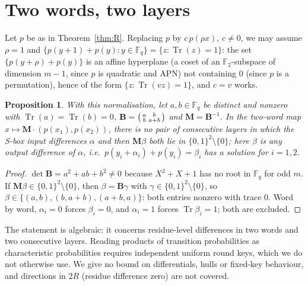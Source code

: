 \documentclass[preprint,12pt]{elsarticle}
\newtheorem{proposition}[theorem]{Proposition}
\theoremstyle{definition}
\newcommand{\F}{\mathbb{F}}
\newcommand{\Tr}{\operatorname{Tr}}
\begin{document}
\section{Two words, two layers}\label{sec:W}
Let $p$ be as in Theorem~\ref{thm:R}. Replacing $p$ by $c\,p(\rho x)$, $c\ne0$, we may assume $\rho=1$ and $\{p(y+1)+p(y):y\in\F_q\}=\{z:\Tr(z)=1\}$: the set $\{p(y+\rho)+p(y)\}$ is an affine hyperplane (a coset of an $\F_2$-subspace of dimension $m-1$, since $p$ is quadratic and APN) not containing $0$ (since $p$ is a permutation), hence of the form $\{z:\Tr(vz)=1\}$, and $c=v$ works.
\begin{proposition}\label{prop:W}
With this normalisation, let $a,b\in\F_q$ be distinct and nonzero with $\Tr(a)=\Tr(b)=0$, $\mathbf B=\begin{psmallmatrix}a&b\\b&a+b\end{psmallmatrix}$ and $\mathbf M=\mathbf B^{-1}$. In the two-word map $x\mapsto\mathbf M\cdot(p(x_1),p(x_2))$, there is no pair of consecutive layers in which the S-box input differences $\alpha$ and then $\mathbf M\beta$ both lie in $\{0,1\}^2\setminus\{0\}$; here $\beta$ is any output difference of $\alpha$, i.e.\ $p(y_i+\alpha_i)+p(y_i)=\beta_i$ has a solution for $i=1,2$.
\end{proposition}
\begin{proof}
$\det\mathbf B=a^2+ab+b^2\ne0$ because $X^2+X+1$ has no root in $\F_q$ for odd $m$. If $\mathbf M\beta\in\{0,1\}^2\setminus\{0\}$, then $\beta=\mathbf B\gamma$ with $\gamma\in\{0,1\}^2\setminus\{0\}$, so $\beta\in\{(a,b),(b,a+b),(a+b,a)\}$: both entries nonzero with trace $0$. Word by word, $\alpha_i=0$ forces $\beta_i=0$, and $\alpha_i=1$ forces $\Tr\beta_i=1$; both are excluded.
\end{proof}
The statement is algebraic: it concerns residue-level differences in two words and two consecutive layers. Reading products of transition probabilities as characteristic probabilities requires independent uniform round keys, which we do not otherwise use. We give no bound on differentials, hulls or fixed-key behaviour, and directions in $2R$ (residue difference zero) are not covered.
\end{document}
